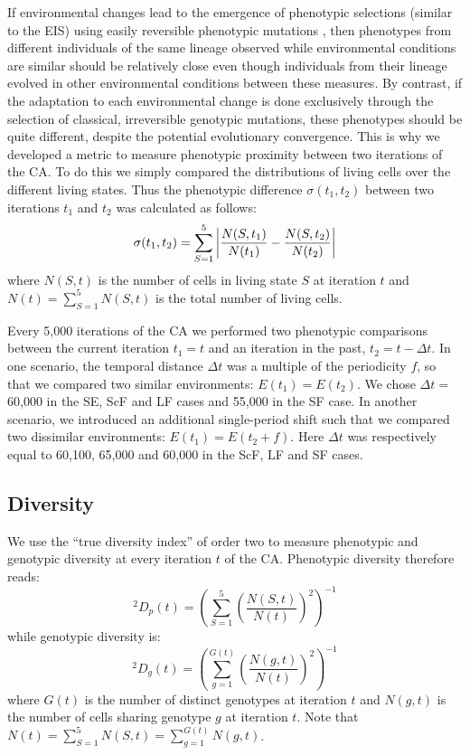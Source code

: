If environmental changes lead to the emergence of phenotypic selections (similar to the EIS) using easily reversible phenotypic mutations \citep{jablonka2014evolution}, then phenotypes from different individuals of the same lineage observed while environmental conditions are similar should be relatively close even though individuals from their lineage evolved in other environmental conditions between these measures. By contrast, if the adaptation to each environmental change is done exclusively through the selection of classical, irreversible genotypic mutations, these phenotypes should be quite different, despite the potential evolutionary convergence. This is why we developed a metric to measure phenotypic proximity between two iterations of the CA. To do this we simply compared the distributions of living cells over the different living states. Thus the phenotypic difference $\sigma(t_1,t_2)$ between two iterations $t_1$ and $t_2$ was calculated as follows:
%
$$\sigma(t_1,t_2) = \sum_{S=1}^5 \left| \frac{N(S,t_1)}{N(t_1)}-\frac{N(S,t_2)}{N(t_2)}\right|$$ 
%
where $N(S,t)$ is the number of cells in living state $S$ at iteration $t$ and $N(t)=\sum_{S=1}^5 N(S,t)$ is the total number of living cells.

Every 5,000 iterations of the CA we performed two phenotypic comparisons between the current iteration $t_1 = t$ and an iteration in the past, $t_2 = t - \Delta t$. In one scenario, the temporal distance $\Delta t$ was a multiple of the periodicity $f$, so that we compared two similar environments: $E(t_1) = E(t_2)$. We chose $\Delta t =$ 60,000 in the SE, ScF and LF cases and 55,000 in the SF case. In another scenario, we introduced an additional single-period shift such that we compared two dissimilar environments: $E(t_1) = E(t_2 + f)$. Here $\Delta t$ was respectively equal to 60,100, 65,000 and 60,000 in the ScF, LF and SF cases.

\subsection{Diversity}

We use the ``true diversity index'' of order two \citep{jost2006entropy} to measure phenotypic and genotypic diversity at every iteration $t$ of the CA. Phenotypic diversity therefore reads:
%
$$^2\!D_p(t)=\left(\sum_{S=1}^5 \left(\frac{N(S,t)}{N(t)}\right)^2\right)^{-1}$$
%
while genotypic diversity is:
%
$$^2\!D_g(t)=\left(\sum_{g=1}^{G(t)} \left(\frac{N(g,t)}{N(t)}\right)^2\right)^{-1}$$
%
where $G(t)$ is the number of distinct genotypes at iteration $t$ and $N(g,t)$ is the number of cells sharing genotype $g$ at iteration $t$. Note that $N(t)=\sum_{S=1}^5 N(S,t)=\sum_{g=1}^{G(t)} N(g,t)$.


